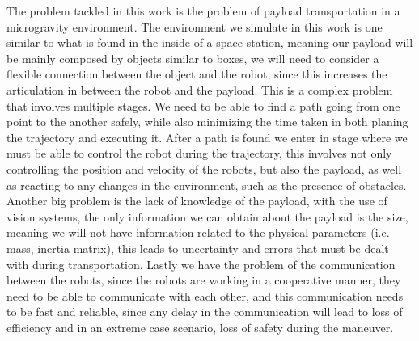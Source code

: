 The problem tackled in this work is the problem of payload transportation in a microgravity environment. The environment we simulate in this work is one similar to what is found in the inside of a space station, meaning our payload will be mainly composed by objects similar to boxes, we will need to consider a flexible connection between the object and the robot, since this increases the articulation in between the robot and the payload. This is a complex problem that involves multiple stages. We need to be able to find a path going from one point to the another safely, while also minimizing the time taken in both planing the trajectory and executing it. After a path is found we enter in stage where we must be able to control the robot during the trajectory, this involves not only controlling the position and velocity of the robots, but also the payload, as well as reacting to any changes in the environment, such as the presence of obstacles. Another big problem is the lack of knowledge of the payload, with the use of vision systems, the only information we can obtain about the payload is the size, meaning we will not have information related to the physical parameters (i.e. mass, inertia matrix), this leads to uncertainty and errors that must be dealt with during transportation. Lastly we have the problem of the communication between the robots, since the robots are working in a cooperative manner, they need to be able to communicate with each other, and this communication needs to be fast and reliable, since any delay in the communication will lead to loss of efficiency and in an extreme case scenario, loss of safety during the maneuver.